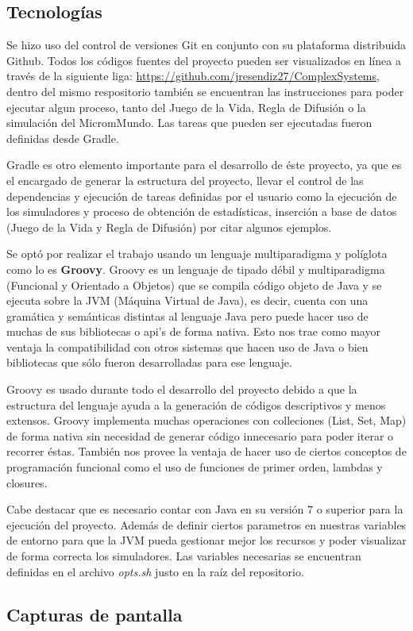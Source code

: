   \subsection{Tecnologías}
    Se hizo uso del control de versiones Git en conjunto con su plataforma distribuida Github. Todos los códigos fuentes del proyecto pueden ser visualizados en línea a través de la siguiente liga: \url{https://github.com/jresendiz27/ComplexSystems}, dentro del mismo respositorio también se encuentran las instrucciones para poder ejecutar algun proceso, tanto del Juego de la Vida, Regla de Difusión o la simulación del MicromMundo. Las tareas que pueden ser ejecutadas fueron definidas desde Gradle.

    Gradle es otro elemento importante para el desarrollo de éste proyecto, ya que es el encargado de generar la estructura del proyecto, llevar el control de las dependencias y ejecución de tareas definidas por el usuario como la ejecución de los simuladores y proceso de obtención de estadísticas, inserción a base de datos (Juego de la Vida y Regla de Difusión) por citar algunos ejemplos.

    Se optó por realizar el trabajo usando un lenguaje multiparadigma y políglota como lo es \textbf{Groovy}. Groovy es un lenguaje de tipado débil y multiparadigma (Funcional y Orientado a Objetos) que se compila código objeto de Java y se ejecuta sobre la JVM (Máquina Virtual de Java), es decir, cuenta con una gramática y semánticas distintas al lenguaje Java pero puede hacer uso de muchas de sus bibliotecas o api's de forma nativa. Esto nos trae como mayor ventaja la compatibilidad con otros sistemas que hacen uso de Java o bien bibliotecas que sólo fueron desarrolladas para ese lenguaje.

    Groovy es usado durante todo el desarrollo del proyecto debido a que la estructura del lenguaje ayuda a la generación de códigos descriptivos y menos extensos. Groovy implementa muchas operaciones con colleciones (List, Set, Map) de forma nativa sin necesidad de generar código innecesario para poder iterar o recorrer éstas. También nos provee la ventaja de hacer uso de ciertos conceptos de programación funcional como el uso de funciones de primer orden, lambdas y closures.

    Cabe destacar que es necesario contar con Java en su versión 7 o superior para la ejecución del proyecto. Además de definir ciertos parametros en nuestras variables de entorno para que la JVM pueda gestionar mejor los recursos y poder visualizar de forma correcta los simuladores. Las variables necesarias se encuentran definidas en el archivo \textit{opts.sh} justo en la raíz del repositorio.
  \subsection{Capturas de pantalla}  